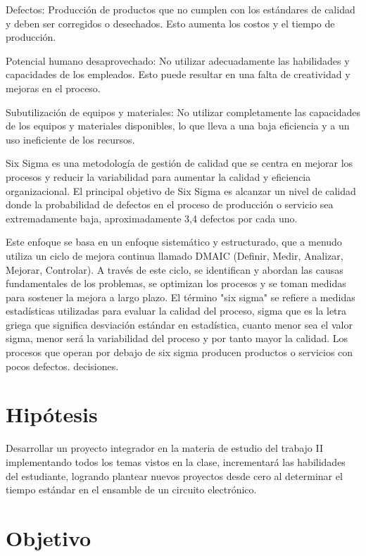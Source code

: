     Defectos: Producción de productos que no cumplen con los estándares de calidad y deben ser corregidos o desechados. Esto aumenta los costos y el tiempo de producción.
    
    Potencial humano desaprovechado: No utilizar adecuadamente las habilidades y capacidades de los empleados. Esto puede resultar en una falta de creatividad y mejoras en el proceso.
    
    Subutilización de equipos y materiales: No utilizar completamente las capacidades de los equipos y materiales disponibles, lo que lleva a una baja eficiencia y a un uso ineficiente de los recursos.
    
    
    Six Sigma es una metodología de gestión de calidad que se centra en mejorar los procesos y reducir la variabilidad para aumentar la calidad y eficiencia organizacional. El principal objetivo de Six Sigma es alcanzar un nivel de calidad donde la probabilidad de defectos en el proceso de producción o servicio sea extremadamente baja, aproximadamente 3,4 defectos por cada uno.
    
    
    Este enfoque se basa en un enfoque sistemático y estructurado, que a menudo utiliza un ciclo de mejora continua llamado DMAIC (Definir, Medir, Analizar, Mejorar, Controlar). A través de este ciclo, se identifican y abordan las causas fundamentales de los problemas, se optimizan los procesos y se toman medidas para sostener la mejora a largo plazo. El término "six sigma" se refiere a medidas estadísticas utilizadas para evaluar la calidad del proceso, sigma que es la letra griega que significa desviación estándar en estadística, cuanto menor sea el valor sigma, menor será la variabilidad del proceso y por tanto mayor la calidad. Los procesos que operan por debajo de six sigma producen productos o servicios con pocos defectos. decisiones.
    
    
    
    \section{Hipótesis}
    
    Desarrollar un proyecto integrador en la materia de estudio del trabajo II implementando todos los temas vistos en la clase, incrementará las habilidades del estudiante, logrando plantear nuevos proyectos desde cero al determinar el tiempo estándar en el ensamble de un circuito electrónico.
    
    \section{Objetivo}
    
